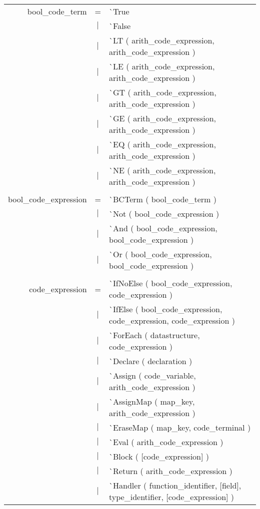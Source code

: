 \documentclass{article}
\begin{document}
\begin{tabular}[ht] {rcl}
bool\_code\_term &=& \`{}True \\
&$\lvert$ & \`{}False \\
&$\lvert$ & \`{}LT ( arith\_code\_expression, arith\_code\_expression )\\
&$\lvert$ & \`{}LE ( arith\_code\_expression, arith\_code\_expression )\\
&$\lvert$ & \`{}GT ( arith\_code\_expression, arith\_code\_expression )\\
&$\lvert$ & \`{}GE ( arith\_code\_expression, arith\_code\_expression )\\
&$\lvert$ & \`{}EQ ( arith\_code\_expression, arith\_code\_expression )\\
&$\lvert$ & \`{}NE ( arith\_code\_expression, arith\_code\_expression )\\
\\
bool\_code\_expression &=& \`{}BCTerm ( bool\_code\_term )\\
&$\lvert$ & \`{}Not ( bool\_code\_expression )\\
&$\lvert$ & \`{}And ( bool\_code\_expression, bool\_code\_expression )\\
&$\lvert$ & \`{}Or ( bool\_code\_expression, bool\_code\_expression )\\
\\
code\_expression &=& \`{}IfNoElse ( bool\_code\_expression, code\_expression )\\
&$\lvert$ & \`{}IfElse ( bool\_code\_expression, code\_expression, code\_expression )\\
&$\lvert$ & \`{}ForEach ( datastructure, code\_expression )\\
&$\lvert$ & \`{}Declare ( declaration )\\
&$\lvert$ & \`{}Assign ( code\_variable, arith\_code\_expression )\\
&$\lvert$ & \`{}AssignMap ( map\_key, arith\_code\_expression )\\
&$\lvert$ & \`{}EraseMap ( map\_key, code\_terminal )\\
&$\lvert$ & \`{}Eval ( arith\_code\_expression )\\
&$\lvert$ & \`{}Block ( [code\_expression] )\\
&$\lvert$ & \`{}Return ( arith\_code\_expression )\\
&$\lvert$ & \`{}Handler ( function\_identifier, [field], type\_identifier, [code\_expression] )\\
\end{tabular}
\pagebreak
\end{document}
